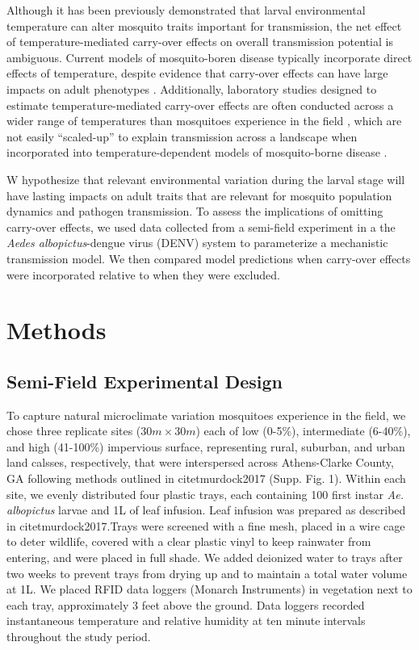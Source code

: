 \documentclass[12pt]{article}
\begin{document}
Although it has been previously demonstrated that larval environmental temperature can alter mosquito traits important for transmission, the net effect of temperature-mediated carry-over effects on overall transmission potential is ambiguous. Current models of mosquito-boren disease typically incorporate direct effects of temperature, despite evidence that carry-over effects can have large impacts on adult phenotypes \citep{muturi2011c, muturi2011a,price2015}. Additionally, laboratory studies designed to estimate temperature-mediated carry-over effects are often conducted across a wider range of temperatures than mosquitoes experience in the field \citep{cator2013}, which are not easily ``scaled-up'' to explain transmission across a landscape when incorporated into temperature-dependent models of mosquito-borne disease \citep{reiner2013}.

W hypothesize that relevant environmental variation during the larval stage will have lasting impacts on adult traits that are relevant for mosquito population dynamics and pathogen transmission. To assess the implications of omitting carry-over effects, we used data collected from a semi-field experiment in a the \textit{Aedes albopictus}-dengue virus (DENV) system to parameterize a mechanistic transmission model. We then compared model predictions when carry-over effects were incorporated relative to when they were excluded.

\section{Methods}
\subsection{Semi-Field Experimental Design}

To capture natural microclimate variation mosquitoes experience in the field, we chose three replicate sites ($30m \times 30m$) each of low (0-5\%), intermediate (6-40\%), and high (41-100\%) impervious surface, representing rural, suburban, and urban land calsses, respectively, that were interspersed across Athens-Clarke County, GA following methods outlined in citet{murdock2017} (Supp. Fig. 1). Within each site, we evenly distributed four plastic trays, each containing 100 first instar \textit{Ae. albopictus} larvae and 1L of leaf infusion. Leaf infusion was prepared as described in citet{murdock2017}.Trays were screened with a fine mesh, placed in a wire cage to deter wildlife, covered with a clear plastic vinyl to keep rainwater from entering, and were placed in full shade. We added deionized water to trays after two weeks to prevent trays from drying up and to maintain a total water volume at 1L. We placed RFID data loggers (Monarch Instruments) in vegetation next to each tray, approximately 3 feet above the ground. Data loggers recorded instantaneous temperature and relative humidity at ten minute intervals throughout the study period.
\end{document}
